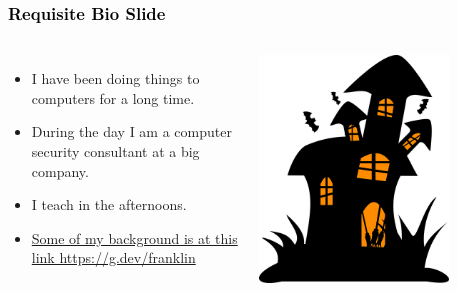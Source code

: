 \documentclass[aspectratio=169]{beamer}
\begin{document}
{
    \begin{frame}
        \frametitle{\textcolor{black}{Requisite Bio Slide}}

        \begin{columns}
            \begin{itemize}
                \item {I have been doing things to computers for a long time.}
                \item {During the day I am a computer security consultant at a big company.}
                \item {I teach in the afternoons.}
                \item {\href{https://g.dev/franklin}{Some of my background is at this link https://g.dev/franklin}}
            \end{itemize}
            \includegraphics[width=0.75\textwidth]{../static/images/new_logo.png}
        \end{columns}
    \end{frame}
}
\end{document}
